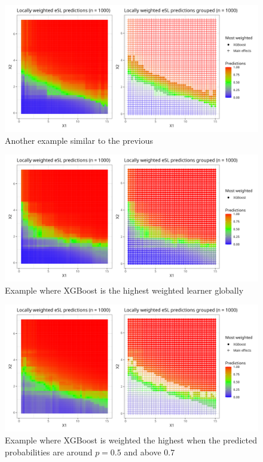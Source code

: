 \documentclass[11pt, a4paper]{article}
\theoremstyle{definition}
\theoremstyle{remark}
\begin{document}
\begin{figure}[H]
    \centering
    \centerline{\includegraphics[width=1.2\textwidth]{figures/esl_preds_lw_stratified_tiled5.png}}
    \caption{Another example similar to the previous}
    \label{fig:esl_preds_lw_stratified_tiled5}
\end{figure}
\begin{figure}[H]
    \centering
    \centerline{\includegraphics[width=1.2\textwidth]{figures/esl_preds_lw_stratified_tiled3.png}}
    \caption{Example where XGBoost is the highest weighted learner globally}
    \label{fig:esl_preds_lw_stratified_tiled3}
\end{figure}

\begin{figure}[H]
    \centering
    \centerline{\includegraphics[width=1.2\textwidth]{figures/esl_preds_lw_stratified_tiled4.png}}
    \caption{Example where XGBoost is weighted the highest when the predicted probabilities are around $ p = 0.5 $ and above $ 0.7$}
    \label{fig:esl_preds_lw_stratified_tiled4}
\end{figure}

\newpage
\printbibliography
\end{document}
